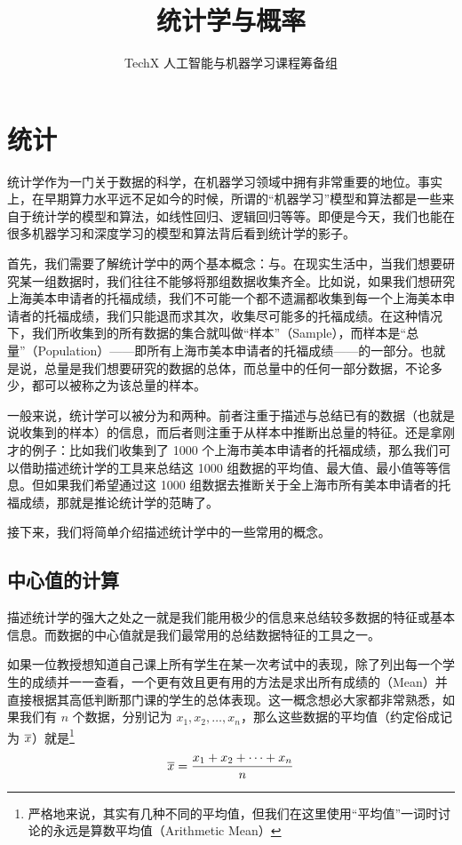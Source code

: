 \documentclass{styles/main}
\title{\textbf{统计学与概率}}
\author{TechX 人工智能与机器学习课程筹备组}
\date{}
\begin{document}
\maketitle


\section{统计}

统计学作为一门关于数据的科学，在机器学习领域中拥有非常重要的地位。事实上，在早期算力水平远不足如今的时候，所谓的``机器学习''模型和算法都是一些来自于统计学的模型和算法，如线性回归、逻辑回归等等。即便是今天，我们也能在很多机器学习和深度学习的模型和算法背后看到统计学的影子。

首先，我们需要了解统计学中的两个基本概念：与。在现实生活中，当我们想要研究某一组数据时，我们往往不能够将那组数据收集齐全。比如说，如果我们想研究上海美本申请者的托福成绩，我们不可能一个都不遗漏都收集到每一个上海美本申请者的托福成绩，我们只能退而求其次，收集尽可能多的托福成绩。在这种情况下，我们所收集到的所有数据的集合就叫做``样本''（Sample），而样本是``总量''（Population）——即所有上海市美本申请者的托福成绩——的一部分。也就是说，总量是我们想要研究的数据的总体，而总量中的任何一部分数据，不论多少，都可以被称之为该总量的样本。

一般来说，统计学可以被分为和两种。前者注重于描述与总结已有的数据（也就是说收集到的样本）的信息，而后者则注重于从样本中推断出总量的特征。还是拿刚才的例子：比如我们收集到了 1000 个上海市美本申请者的托福成绩，那么我们可以借助描述统计学的工具来总结这 1000 组数据的平均值、最大值、最小值等等信息。但如果我们希望通过这 1000 组数据去推断关于全上海市所有美本申请者的托福成绩，那就是推论统计学的范畴了。

接下来，我们将简单介绍描述统计学中的一些常用的概念。


\subsection{中心值的计算}

  描述统计学的强大之处之一就是我们能用极少的信息来总结较多数据的特征或基本信息。而数据的中心值就是我们最常用的总结数据特征的工具之一。
  
  如果一位教授想知道自己课上所有学生在某一次考试中的表现，除了列出每一个学生的成绩并一一查看，一个更有效且更有用的方法是求出所有成绩的（Mean）并直接根据其高低判断那门课的学生的总体表现。这一概念想必大家都非常熟悉，如果我们有 $n$ 个数据，分别记为 $x_1, x_2, \dots, x_n$，那么这些数据的平均值（约定俗成记为 $\overline{x}$）就是\footnote{严格地来说，其实有几种不同的平均值，但我们在这里使用``平均值''一词时讨论的永远是算数平均值（Arithmetic Mean）}
  \[ \overline{x} = \frac{x_1 + x_2 + \dots + x_n}{n} \]
  
\end{document}
